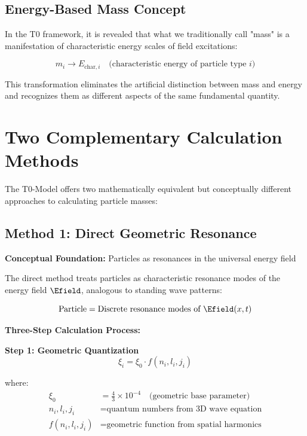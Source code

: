 	\subsection{Energy-Based Mass Concept}
	\label{subsec:energy_based_mass}
	
	In the T0 framework, it is revealed that what we traditionally call "mass" is a manifestation of characteristic energy scales of field excitations:
	
	\begin{equation}
		\boxed{m_i \rightarrow E_{\text{char},i} \quad \text{(characteristic energy of particle type } i\text{)}}
		\label{eq:mass_to_energy}
	\end{equation}
	
	This transformation eliminates the artificial distinction between mass and energy and recognizes them as different aspects of the same fundamental quantity.
	
	\section{Two Complementary Calculation Methods}
	\label{sec:two_calculation_methods}
	
	The T0-Model offers two mathematically equivalent but conceptually different approaches to calculating particle masses:
	
	\subsection{Method 1: Direct Geometric Resonance}
	\label{subsec:direct_geometric_method}
	
	\textbf{Conceptual Foundation:} Particles as resonances in the universal energy field
	
	The direct method treats particles as characteristic resonance modes of the energy field $\Efield$, analogous to standing wave patterns:
	
	\begin{equation}
		\text{Particle} = \text{Discrete resonance modes of } \Efield(x,t)
	\end{equation}
	
	\textbf{Three-Step Calculation Process:}
	
	\textbf{Step 1: Geometric Quantization}
	\begin{equation}
		\xi_i = \xi_0 \cdot f(n_i, l_i, j_i)
		\label{eq:geometric_quantization}
	\end{equation}
	
	where:
	\begin{align}
		\xi_0 &= \frac{4}{3} \times 10^{-4} \quad \text{(geometric base parameter)} \\
		n_i, l_i, j_i &= \text{quantum numbers from 3D wave equation} \\
		f(n_i, l_i, j_i) &= \text{geometric function from spatial harmonics}
	\end{align}
	
